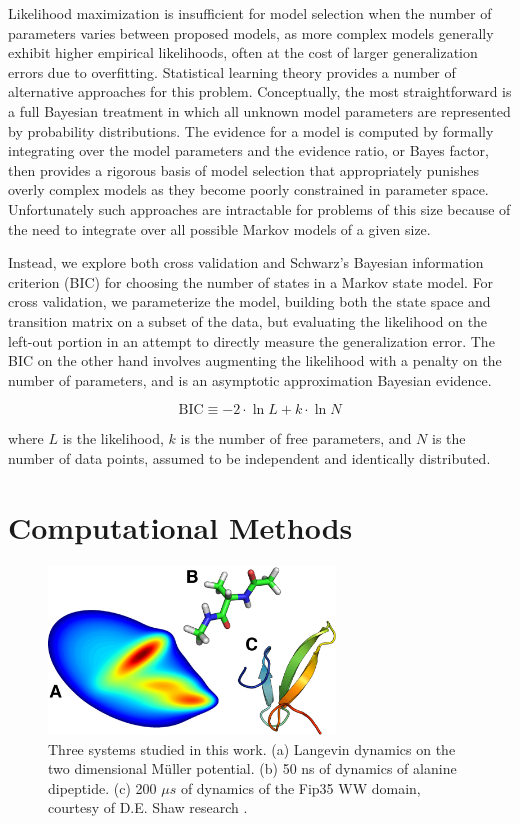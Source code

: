 \documentclass[twocolumn,floatfix,nofootinbib,aps]{revtex4-1}
\begin{document}
Likelihood maximization is insufficient for model selection when the number of parameters varies between proposed models, as more complex models generally exhibit higher empirical likelihoods, often at the cost of larger generalization errors due to overfitting\cite{Liddle2007Information, Hastie01Elements}. Statistical learning theory provides a number of alternative approaches for this problem. Conceptually, the most straightforward is a full Bayesian treatment in which all unknown model parameters are represented by probability distributions. The evidence for a model is computed by formally integrating over the model parameters and the evidence ratio, or Bayes factor\cite{Gelfand94Bayesian}, then provides a rigorous basis of model selection that appropriately punishes overly complex models as they become poorly constrained in parameter space. Unfortunately such approaches are intractable for problems of this size because of the need to integrate over all possible Markov models of a given size.

Instead, we explore both cross validation and Schwarz's Bayesian information criterion (BIC)\cite{Schwartz78Estimating} for choosing the number of states in a Markov state model. For cross validation, we parameterize the model, building both the state space and transition matrix on a subset of the data, but evaluating the likelihood on the left-out portion in an attempt to directly measure the generalization error. The BIC on the other hand involves augmenting the likelihood with a penalty on the number of parameters, and is
an asymptotic approximation Bayesian evidence.

\begin{equation}
\label{eq:bic}
\mathrm{BIC} \equiv -2\cdot \ln L + k \cdot \ln N
\end{equation}

where $L$ is the likelihood, $k$ is the number of free parameters, and $N$ is the number of data points, assumed to be independent and identically distributed.

\section{Computational Methods}

\begin{figure}
\centering
\includegraphics[width=3in]{figs/fig1_rbow.png}
\caption{Three systems studied in this work. (a) Langevin dynamics on the two dimensional M\"{u}ller potential. (b) 50 ns of dynamics of alanine dipeptide. (c) 200 $\mu s$ of dynamics of the Fip35 WW domain\cite{Liu2008Experimental}, courtesy of D.E. Shaw research \cite{Shaw2010Atomic}.}
\end{figure}
\end{document}
